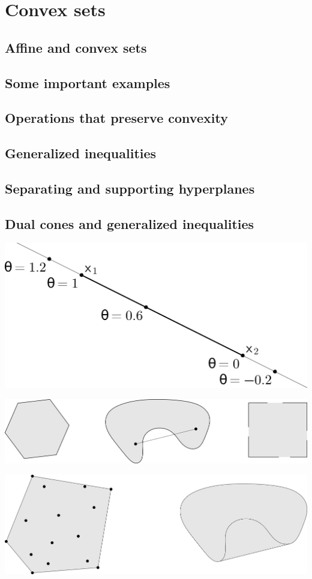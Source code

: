 \chapter{Convex sets}

\clearpage
\section{Affine and convex sets}

\clearpage
\section{Some important examples}

\clearpage
\section{Operations that preserve convexity}

\clearpage
\section{Generalized inequalities}

\clearpage
\section{Separating and supporting hyperplanes}

\clearpage
\section{Dual cones and generalized inequalities}


\clearpage
\hfil\includegraphics[width=.5\textwidth]{../Graphics/022.png}\hfil

\clearpage
\hfil\includegraphics[width=.5\textwidth]{../Graphics/024a.png}\hfil

\clearpage
\hfil\includegraphics[width=.5\textwidth]{../Graphics/024b.png}\hfil

